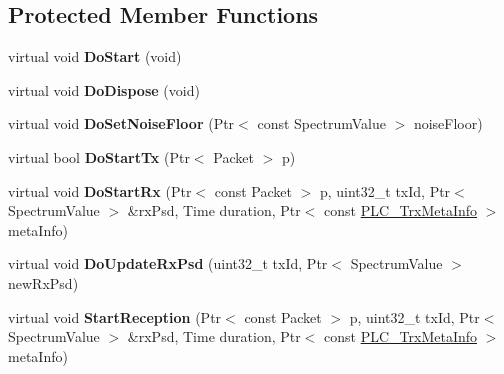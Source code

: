 \subsection*{\-Protected \-Member \-Functions}
\begin{DoxyCompactItemize}
\item 
\hypertarget{classns3_1_1PLC__InformationRatePhy_a3bac5d0eeb36cee3bdf9a880be7495e8}{virtual void {\bfseries \-Do\-Start} (void)}\label{classns3_1_1PLC__InformationRatePhy_a3bac5d0eeb36cee3bdf9a880be7495e8}

\item 
\hypertarget{classns3_1_1PLC__InformationRatePhy_a6cb0013270e368139cf710371cf8c9ff}{virtual void {\bfseries \-Do\-Dispose} (void)}\label{classns3_1_1PLC__InformationRatePhy_a6cb0013270e368139cf710371cf8c9ff}

\item 
\hypertarget{classns3_1_1PLC__InformationRatePhy_a79700be8272f4156d23ec6356f675be9}{virtual void {\bfseries \-Do\-Set\-Noise\-Floor} (\-Ptr$<$ const \-Spectrum\-Value $>$ noise\-Floor)}\label{classns3_1_1PLC__InformationRatePhy_a79700be8272f4156d23ec6356f675be9}

\item 
\hypertarget{classns3_1_1PLC__InformationRatePhy_a1746d2858e9596d44e87e5a5c3dcdd73}{virtual bool {\bfseries \-Do\-Start\-Tx} (\-Ptr$<$ \-Packet $>$ p)}\label{classns3_1_1PLC__InformationRatePhy_a1746d2858e9596d44e87e5a5c3dcdd73}

\item 
\hypertarget{classns3_1_1PLC__InformationRatePhy_a7d14bce650ce44e393422441b83ab1a1}{virtual void {\bfseries \-Do\-Start\-Rx} (\-Ptr$<$ const \-Packet $>$ p, uint32\-\_\-t tx\-Id, \-Ptr$<$ \-Spectrum\-Value $>$ \&rx\-Psd, \-Time duration, \-Ptr$<$ const \hyperlink{classns3_1_1PLC__TrxMetaInfo}{\-P\-L\-C\-\_\-\-Trx\-Meta\-Info} $>$ meta\-Info)}\label{classns3_1_1PLC__InformationRatePhy_a7d14bce650ce44e393422441b83ab1a1}

\item 
\hypertarget{classns3_1_1PLC__InformationRatePhy_a6bc7022d2f5a664d7b0cb422758af210}{virtual void {\bfseries \-Do\-Update\-Rx\-Psd} (uint32\-\_\-t tx\-Id, \-Ptr$<$ \-Spectrum\-Value $>$ new\-Rx\-Psd)}\label{classns3_1_1PLC__InformationRatePhy_a6bc7022d2f5a664d7b0cb422758af210}

\item 
\hypertarget{classns3_1_1PLC__InformationRatePhy_a57c6636bedb4b579414371f12395a8d6}{virtual void {\bfseries \-Start\-Reception} (\-Ptr$<$ const \-Packet $>$ p, uint32\-\_\-t tx\-Id, \-Ptr$<$ \-Spectrum\-Value $>$ \&rx\-Psd, \-Time duration, \-Ptr$<$ const \hyperlink{classns3_1_1PLC__TrxMetaInfo}{\-P\-L\-C\-\_\-\-Trx\-Meta\-Info} $>$ meta\-Info)}\label{classns3_1_1PLC__InformationRatePhy_a57c6636bedb4b579414371f12395a8d6}


\end{DoxyCompactItemize}
